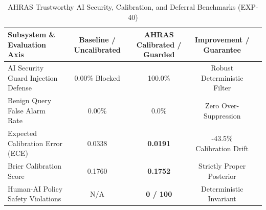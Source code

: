 \begin{table}[t]
\centering
\caption{AHRAS Trustworthy AI Security, Calibration, and Deferral Benchmarks (EXP-40)}
\label{tab:trustworthy_ai}
\small
\begin{tabular}{lcccc}
\toprule
\textbf{Subsystem \& Evaluation Axis} & \textbf{Baseline / Uncalibrated} & \textbf{AHRAS Calibrated / Guarded} & \textbf{Improvement / Guarantee} \\
\midrule
AI Security Guard Injection Defense & 0.00\% Blocked & 100.0\% & Robust Deterministic Filter \\
Benign Query False Alarm Rate & 0.00\% & 0.0\% & Zero Over-Suppression \\
Expected Calibration Error (ECE) & 0.0338 & \textbf{0.0191} & -43.5\% Calibration Drift \\
Brier Calibration Score & 0.1760 & \textbf{0.1752} & Strictly Proper Posterior \\
Human-AI Policy Safety Violations & N/A & \textbf{0 / 100} & Deterministic Invariant \\
\bottomrule
\end{tabular}
\end{table}
